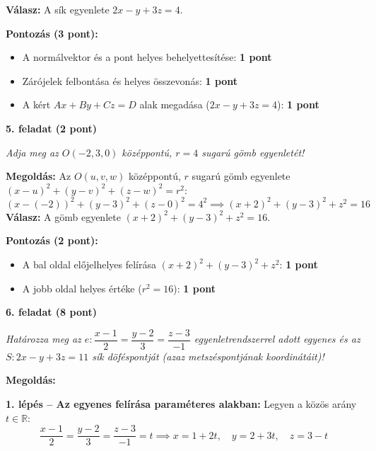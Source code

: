 \documentclass[11pt, a4paper]{article}
\begin{document}
\textbf{Válasz:} A sík egyenlete \textbf{$2x - y + 3z = 4$}.

{\color{muted}\small\textbf{Pontozás (3 pont):}}
\begin{itemize}
    \item {\color{muted}\small A normálvektor és a pont helyes behelyettesítése: \textbf{1 pont}}
    \item {\color{muted}\small Zárójelek felbontása és helyes összevonás: \textbf{1 pont}}
    \item {\color{muted}\small A kért $Ax + By + Cz = D$ alak megadása ($2x - y + 3z = 4$): \textbf{1 pont}}
\end{itemize}

\newpage

{\color{primary}\bfseries 5. feladat (2 pont)}

\textit{Adja meg az $O(-2,3,0)$ középpontú, $r=4$ sugarú gömb egyenletét!}

\textbf{Megoldás:} Az $O(u, v, w)$ középpontú, $r$ sugarú gömb egyenlete $(x - u)^2 + (y - v)^2 + (z - w)^2 = r^2$:
\[
(x - (-2))^2 + (y - 3)^2 + (z - 0)^2 = 4^2 \implies (x + 2)^2 + (y - 3)^2 + z^2 = 16
\]
\textbf{Válasz:} A gömb egyenlete \textbf{$(x + 2)^2 + (y - 3)^2 + z^2 = 16$}.

{\color{muted}\small\textbf{Pontozás (2 pont):}}
\begin{itemize}
    \item {\color{muted}\small A bal oldal előjelhelyes felírása $(x+2)^2 + (y-3)^2 + z^2$: \textbf{1 pont}}
    \item {\color{muted}\small A jobb oldal helyes értéke ($r^2 = 16$): \textbf{1 pont}}
\end{itemize}

\vspace{7pt}{\color{rulegray}\hrule}\vspace{9pt}

{\color{primary}\bfseries 6. feladat (8 pont)}

\textit{Határozza meg az $e:\dfrac{x-1}{2}=\dfrac{y-2}{3}=\dfrac{z-3}{-1}$ egyenletrendszerrel adott egyenes és az $S:2x-y+3z=11$ sík döféspontját (azaz metszéspontjának koordinátáit)!}

\textbf{Megoldás:}

\textbf{1. lépés – Az egyenes felírása paraméteres alakban:} Legyen a közös arány $t \in \mathbb{R}$:
\[
\frac{x-1}{2} = \frac{y-2}{3} = \frac{z-3}{-1} = t \implies x = 1 + 2t, \quad y = 2 + 3t, \quad z = 3 - t
\]
\end{document}
